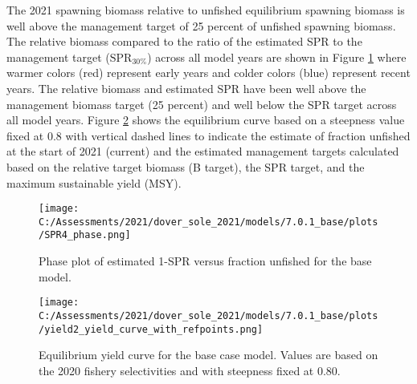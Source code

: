 \documentclass[11pt,
  english,
  a4paper,
]{article}
\begin{document}
The 2021 spawning biomass relative to unfished equilibrium spawning biomass is well above the management target of 25 percent of unfished spawning biomass. The relative biomass compared to the ratio of the estimated SPR to the management target ({\(\text{SPR}_{30\%}\)\leavevmode\tagmcend\tagstructend}) across all model years are shown in Figure \ref{fig:es-phase} where warmer colors (red) represent early years and colder colors (blue) represent recent years. The relative biomass and estimated SPR have been well above the management biomass target (25 percent) and well below the SPR target across all model years. Figure \ref{fig:es-yield} shows the equilibrium curve based on a steepness value fixed at 0.8 with vertical dashed lines to indicate the estimate of fraction unfished at the start of 2021 (current) and the estimated management targets calculated based on the relative target biomass (B target), the SPR target, and the maximum sustainable yield (MSY).

\leavevmode\tagmcend\tagstructend\par


\begin{figure}
\centering
\texttt{[image: C:/Assessments/2021/dover\_sole\_2021/models/7.0.1\_base/plots/SPR4\_phase.png]}
\caption{Phase plot of estimated 1-SPR versus fraction unfished for the base model.\label{fig:es-phase}}
\end{figure}

\tagmcend\tagstructend


\begin{figure}
\centering
\texttt{[image: C:/Assessments/2021/dover\_sole\_2021/models/7.0.1\_base/plots/yield2\_yield\_curve\_with\_refpoints.png]}
\caption{Equilibrium yield curve for the base case model. Values are based on the 2020 fishery selectivities and with steepness fixed at 0.80.\label{fig:es-yield}}
\end{figure}

\tagmcend\tagstructend
\end{document}
